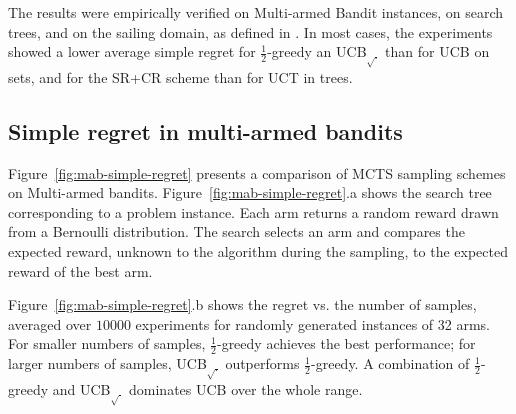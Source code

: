 \documentclass[letterpaper]{article}
\begin{document}
The results were empirically verified on Multi-armed Bandit instances,
on search trees, and on the sailing domain, as defined in
\cite{Kocsis.uct}. In most cases, the experiments showed a lower average
simple regret for $\frac 1 2$-greedy an UCB$_{\sqrt{\cdot}}$ than for
UCB on sets, and for the SR+CR scheme than for UCT in trees.

\subsection{Simple regret in multi-armed bandits}
\label{sec:emp-mab}

Figure~\ref{fig:mab-simple-regret} presents a comparison of MCTS sampling
schemes on Multi-armed bandits. Figure~\ref{fig:mab-simple-regret}.a shows the search tree
corresponding to a problem instance. Each arm returns a random reward
drawn from a Bernoulli distribution. The search selects an arm
and compares the expected reward, unknown to the algorithm during the
sampling, to the expected reward of the best arm.

Figure~\ref{fig:mab-simple-regret}.b shows the regret
vs. the number of samples, averaged over $10000$ experiments for
randomly generated instances of 32 arms. For smaller numbers of
samples, $\frac 1 2$-greedy achieves the best
performance; for larger numbers of samples, UCB$_{\sqrt{\cdot}}$
outperforms $\frac 1 2$-greedy. A combination of $\frac 1
2$-greedy  and UCB$_{\sqrt{\cdot}}$ dominates UCB over the
whole range.
\end{document}
